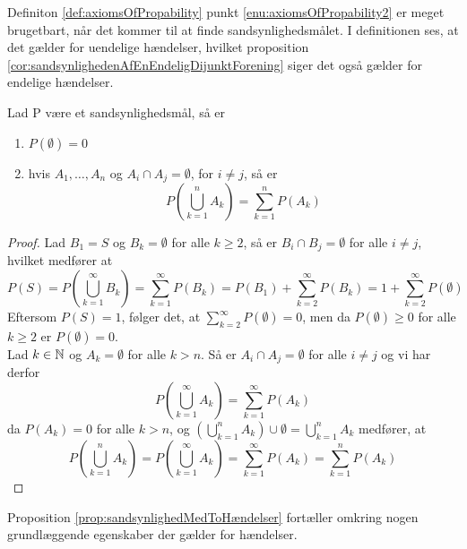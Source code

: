 Definiton \ref{def:axiomsOfPropability} punkt \ref{enu:axiomsOfPropability2} er meget brugetbart, når det kommer til at finde sandsynlighedsmålet. I definitionen ses, at det gælder for uendelige hændelser, hvilket proposition \ref{cor:sandsynlighedenAfEnEndeligDijunktForening} siger det også gælder for endelige hændelser. 

\begin{prop} \label{cor:sandsynlighedenAfEnEndeligDijunktForening} %
Lad P være et sandsynlighedsmål, så er
\begin{enumerate}
    \item $P(\emptyset) = 0$
    \item hvis $A_1, \ldots , A_n$ og $A_i\cap A_j=\emptyset$, for $i \neq j$, så er 
    \begin{equation*}
        P\left(\bigcup^n_{k = 1} A_k\right) = \sum^n_{k = 1} P(A_k)
    \end{equation*}
\end{enumerate}

\end{prop}
\begin{proof}
Lad $B_1 = S$ og $B_k = \emptyset$ for alle $k \geq 2$, så er $B_i \cap B_j = \emptyset$ for alle $i \neq j$, hvilket medfører at \begin{equation*}
    P(S) = P\left(\bigcup^\infty_{k = 1} B_k\right) = \sum^\infty_{k = 1} P(B_k) = P(B_1) + \sum^\infty_{k = 2} P(B_k) = 1 + \sum^\infty_{k = 2} P(\emptyset) 
\end{equation*}
Eftersom $P(S) = 1$, følger det, at $\sum^\infty_{k = 2} P(\emptyset) = 0$, men da $P(\emptyset) \geq 0$ for alle $k \geq 2$ er $P(\emptyset) = 0$. \\
Lad $k\in \mathbb{N}$ og $A_k = \emptyset$ for alle $k > n$. Så er $A_i \cap A_j = \emptyset$ for alle $i \neq j$ og vi har derfor 
\begin{equation*}
    P\left(\bigcup_{k=1}^\infty A_k\right)=\sum_{k=1}^\infty P(A_k)
\end{equation*}
da $P(A_k) = 0$ for alle $k > n$, og $\displaystyle\left(\bigcup^n_{k = 1} A_k\right) \cup \emptyset = \bigcup^n_{k = 1} A_k$ medfører, at
\begin{equation*}
   P\left(\bigcup_{k=1}^n A_k\right) = P\left(\bigcup_{k=1}^\infty A_k\right) = \sum_{k=1}^\infty P(A_k) = \sum_{k=1}^n P(A_k)
\end{equation*}
\end{proof} 
Proposition \ref{prop:sandsynlighedMedToHændelser} fortæller omkring nogen grundlæggende egenskaber der gælder for hændelser. 
